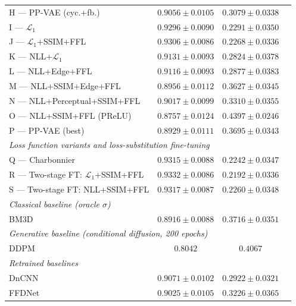 \documentclass[12pt, a4paper, twoside, openright]{book}
\begin{document}
\begin{table}[htbp]
\begin{tabular}{lccc}
H --- PP-VAE (cyc.+fb.)                  & $0.9056 \pm 0.0105$          & $0.3079 \pm 0.0338$ \\
I --- $\mathcal{L}_1$                    & $0.9296 \pm 0.0090$          & $0.2291 \pm 0.0350$ \\
J --- $\mathcal{L}_1$+SSIM+FFL          & $0.9306 \pm 0.0086$          & $0.2268 \pm 0.0336$ \\
K --- NLL+$\mathcal{L}_1$               & $0.9131 \pm 0.0093$          & $0.2824 \pm 0.0378$ \\
L --- NLL+Edge+FFL                       & $0.9116 \pm 0.0093$          & $0.2877 \pm 0.0383$ \\
M --- NLL+SSIM+Edge+FFL                  & $0.8956 \pm 0.0112$          & $0.3627 \pm 0.0345$ \\
N --- NLL+Perceptual+SSIM+FFL            & $0.9017 \pm 0.0099$          & $0.3310 \pm 0.0355$ \\
O --- NLL+SSIM+FFL (PReLU)               & $0.8757 \pm 0.0124$          & $0.4397 \pm 0.0246$ \\
P --- PP-VAE (best)                      & $0.8929 \pm 0.0111$          & $0.3695 \pm 0.0343$ \\
\midrule
\multicolumn{3}{l}{\textit{Loss function variants and loss-substitution fine-tuning}} \\
Q --- Charbonnier                        & $0.9315 \pm 0.0088$          & $0.2242 \pm 0.0347$ \\
R --- Two-stage FT: $\mathcal{L}_1$+SSIM+FFL & $\mathbf{0.9332 \pm 0.0086}$ & $\mathbf{0.2192 \pm 0.0336}$ \\
S --- Two-stage FT: NLL+SSIM+FFL        & $0.9317 \pm 0.0087$          & $0.2260 \pm 0.0348$ \\
\midrule
\multicolumn{3}{l}{\textit{Classical baseline (oracle $\sigma$)}} \\
BM3D \cite{dabov_image_2007}             & $0.8916 \pm 0.0088$          & $0.3716 \pm 0.0351$ \\
\midrule
\multicolumn{3}{l}{\textit{Generative baseline (conditional diffusion, 200 epochs)}} \\
DDPM \cite{saharia_palette_2022}         & $0.8042$                     & $0.4067$ \\
\midrule
\multicolumn{3}{l}{\textit{Retrained baselines}} \\
DnCNN \cite{zhang_beyond_2017}          & $0.9071 \pm 0.0102$          & $0.2922 \pm 0.0321$ \\
FFDNet \cite{zhang_ffdnet_2018}         & $0.9025 \pm 0.0105$          & $0.3226 \pm 0.0365$ \\

\end{tabular}
\end{table}
\end{document}
